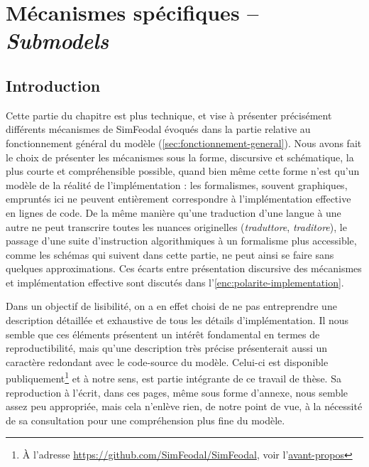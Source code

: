 \let\orisectionmark\sectionmark
\renewcommand\sectionmark[1]{}%
\section[Mécanismes spécifiques -- \textit{Submodels}]{Mécanismes spécifiques -- \large{\textit{Submodels}}\label{sec:meca-specifiques}}
\orisectionmark{Mécanismes spécifiques}
\let\sectionmark\orisectionmark


\subsection{Introduction}

Cette partie du chapitre est plus technique, et vise à présenter précisément différents mécanismes de SimFeodal évoqués dans la partie relative au fonctionnement général du modèle (\cref{sec:fonctionnement-general}).
Nous avons fait le choix de présenter les mécanismes sous la forme, discursive et schématique, la plus courte et compréhensible possible, quand bien même cette forme n'est qu'un \og modèle\fg{} de la réalité de l'implémentation : les formalismes, souvent graphiques, empruntés ici ne peuvent entièrement correspondre à l'implémentation effective en lignes de code.
De la même manière qu'une traduction d'une langue à une autre ne peut transcrire toutes les nuances originelles (\textit{traduttore}, \textit{traditore}), le passage d'une suite d'instruction algorithmiques à un formalisme plus accessible, comme les schémas qui suivent dans cette partie, ne peut ainsi se faire sans quelques approximations.
Ces écarts entre présentation discursive des mécanismes et implémentation effective sont discutés dans l'\cref{enc:polarite-implementation}.

Dans un objectif de lisibilité, on a en effet choisi de ne pas entreprendre une description détaillée et exhaustive de tous les détails d'implémentation.
Il nous semble que ces éléments présentent un intérêt fondamental en termes de reproductibilité, mais qu'une description très précise présenterait aussi un caractère redondant avec le code-source du modèle.
Celui-ci est disponible publiquement\footnote{
	À l'adresse \href{https://github.com/SimFeodal/SimFeodal}{https://github.com/SimFeodal/SimFeodal}, voir l'\hyperlink{avant-propos}{avant-propos}
} et à notre sens, est partie intégrante de ce travail de thèse.
Sa reproduction à l'écrit, dans ces pages, même sous forme d'annexe, nous semble assez peu appropriée, mais cela n'enlève rien, de notre point de vue, à la nécessité de sa consultation pour une compréhension plus fine du modèle.

